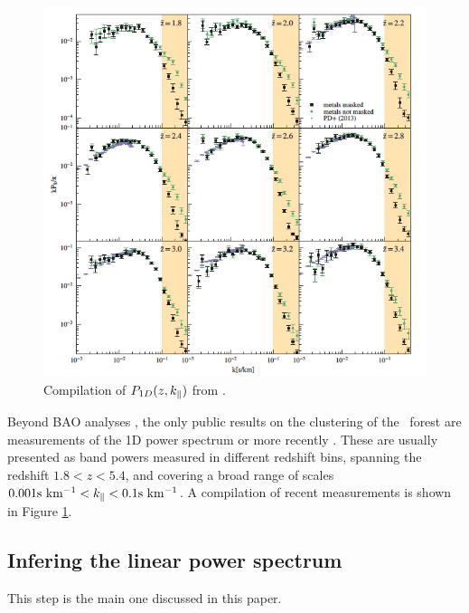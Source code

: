 \begin{figure}[h]
 \begin{center}
  \includegraphics[scale=0.6]{Figures/WaltherP1D}
 \end{center}
 \caption{Compilation of $P_{1D}(z,k_\parallel)$ from \cite{Walther2018}. 
 }
 \label{fig:dataP1D}
\end{figure}

Beyond BAO analyses \cite{Bautista2017,duMasdesBourboux2017}, the only 
public results on the clustering of the \lya\ forest are measurements of 
the 1D power spectrum \cite{Croft1998,McDonald2000,McDonald2006} or 
more recently \cite{Viel2013,Palanque-Delabrouille2013,Irsic2017,Walther2018}.
These are usually presented as band powers measured in different redshift
bins, spanning the redshift $1.8 < z < 5.4$, and covering a broad range of 
scales $0.001 {\rm s~km^{-1}} < k_\parallel < 0.1 {\rm s~km^{-1}}$. 
A compilation of recent measurements is shown in Figure \ref{fig:dataP1D}.


\subsection{Infering the linear power spectrum}

This step is the main one discussed in this paper.


